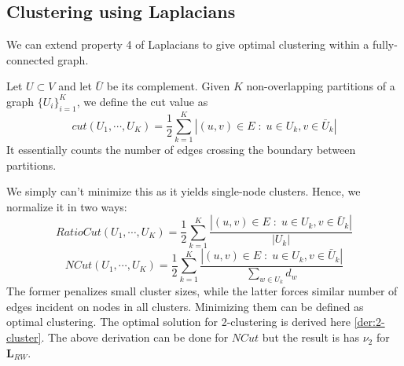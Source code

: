 \subsection{Clustering using Laplacians}
We can extend property 4 of Laplacians to give optimal clustering within a fully-connected graph.
\begin{definition}
Let $U \subset V$ and let $\bar{U}$ be its complement. Given $K$ non-overlapping partitions of a graph $\{U_i\}_{i=1}^K$, we define the cut value as
\begin{equation}
	cut(U_1, \cdots, U_K) = \dfrac{1}{2}\sum_{k=1}^K|(u, v) \in E \; : \; u \in U_k, v \in \bar{U}_k|
\end{equation}
It essentially counts the number of edges crossing the boundary between partitions.
\end{definition}
We simply can't minimize this as it yields single-node clusters. Hence, we normalize it in two ways:
\begin{equation}
RatioCut(U_1, \cdots, U_K) = \dfrac{1}{2}\sum_{k=1}^K\dfrac{|(u, v) \in E \; : \; u \in U_k, v \in \bar{U}_k|}{|U_k|}
\end{equation}
\begin{equation}
NCut(U_1, \cdots, U_K) = \dfrac{1}{2}\sum_{k=1}^K\dfrac{|(u, v) \in E \; : \; u \in U_k, v \in \bar{U}_k|}{\sum_{w \in U_k} d_w}
\end{equation}
The former penalizes small cluster sizes, while the latter forces similar number of edges incident on nodes in all clusters. Minimizing them can be defined as optimal clustering. The optimal solution for 2-clustering is derived here \ref{der:2-cluster}. The above derivation can be done for $NCut$ but the result is has $\nu_2$ for $\mathbf{L}_{RW}$.
